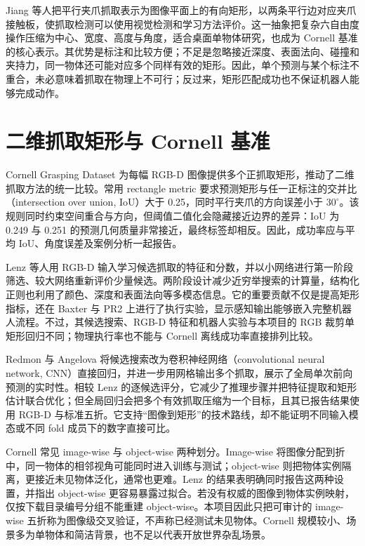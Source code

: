 \documentclass{l4proj}
\begin{document}
Jiang 等人把平行夹爪抓取表示为图像平面上的有向矩形，以两条平行边对应夹爪接触板，使抓取检测可以使用视觉检测和学习方法评价\citep{jiang2011efficient}。这一抽象把复杂六自由度操作压缩为中心、宽度、高度与角度，适合桌面单物体研究，也成为 Cornell 基准的核心表示。其优势是标注和比较方便；不足是忽略接近深度、表面法向、碰撞和夹持力，同一物体还可能对应多个同样有效的矩形。因此，单个预测与某个标注不重合，未必意味着抓取在物理上不可行；反过来，矩形匹配成功也不保证机器人能够完成动作。

\section{二维抓取矩形与 Cornell 基准}
Cornell Grasping Dataset 为每幅 RGB-D 图像提供多个正抓取矩形，推动了二维抓取方法的统一比较。常用 rectangle metric 要求预测矩形与任一正标注的交并比（intersection over union, IoU）大于 0.25，同时平行夹爪的方向误差小于 $30^\circ$。该规则同时约束空间重合与方向，但阈值二值化会隐藏接近边界的差异：IoU 为 0.249 与 0.251 的预测几何质量非常接近，最终标签却相反。因此，成功率应与平均 IoU、角度误差及案例分析一起报告。

Lenz 等人用 RGB-D 输入学习候选抓取的特征和分数，并以小网络进行第一阶段筛选、较大网络重新评价少量候选\citep{lenz2015deep}。两阶段设计减少近穷举搜索的计算量，结构化正则也利用了颜色、深度和表面法向等多模态信息。它的重要贡献不仅是提高矩形指标，还在 Baxter 与 PR2 上进行了执行实验，显示感知输出能够嵌入完整机器人流程。不过，其候选搜索、RGB-D 特征和机器人实验与本项目的 RGB 裁剪单矩形回归不同；物理执行率也不能与 Cornell 离线成功率直接排列比较。

Redmon 与 Angelova 将候选搜索改为卷积神经网络（convolutional neural network, CNN）直接回归，并进一步用网格输出多个抓取，展示了全局单次前向预测的实时性\citep{redmon2015real}。相较 Lenz 的逐候选评分，它减少了推理步骤并把特征提取和矩形估计联合优化；但全局回归会把多个有效抓取压缩为一个目标，且其已报告结果使用 RGB-D 与标准五折。它支持“图像到矩形”的技术路线，却不能证明不同输入模态或不同 fold 成员下的数字直接可比。

Cornell 常见 image-wise 与 object-wise 两种划分。Image-wise 将图像分配到折中，同一物体的相邻视角可能同时进入训练与测试；object-wise 则把物体实例隔离，更接近未见物体泛化，通常也更难。Lenz 的结果表明确同时报告这两种设置，并指出 object-wise 更容易暴露过拟合。若没有权威的图像到物体实例映射，仅按下载目录编号分组不能重建 object-wise。本项目因此只把可审计的 image-wise 五折称为图像级交叉验证，不声称已经测试未见物体。Cornell 规模较小、场景多为单物体和简洁背景，也不足以代表开放世界杂乱场景。
\end{document}

